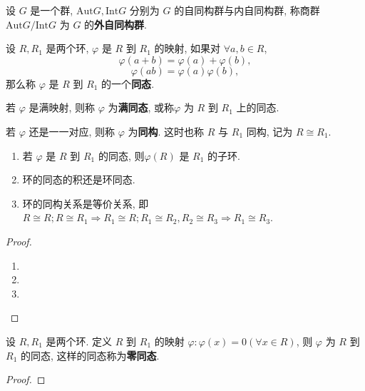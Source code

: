 \documentclass[../../main.tex]{subfiles}
\begin{document}
\begin{definition}
设 \( G \) 是一个群, \( \text{Aut}G, \text{Int}G \) 分别为 \( G \) 的自同构群与内自同构群, 称商群 \( \text{Aut}G/\text{Int}G \) 为 \( G \) 的\textbf{外自同构群}.
\end{definition}

\begin{definition}
设 \( R, R_1 \) 是两个环, \( \varphi \) 是 \( R \) 到 \( R_1 \) 的映射, 如果对 \( \forall a,b \in R \),
\[
\varphi(a + b) = \varphi(a) + \varphi(b),
\]
\[
\varphi(ab) = \varphi(a)\varphi(b),
\]
那么称 \( \varphi \) 是 \( R \) 到 \( R_1 \) 的一个\textbf{同态}.

若 \( \varphi \) 是满映射, 则称 \( \varphi \) 为\textbf{满同态}, 或称\( \varphi \) 为 \( R \) 到 \( R_1 \) 上的同态.

若 \( \varphi \) 还是一一对应, 则称 \( \varphi \) 为\textbf{同构}. 这时也称 \( R \) 与 \( R_1 \) 同构, 记为 \( R \cong R_1 \).
\end{definition}

\begin{proposition}
\begin{enumerate}
\item 若 \( \varphi \) 是 \( R \) 到 \( R_1 \) 的同态, 则\( \varphi(R) \) 是 \( R_1 \) 的子环. 

\item 环的同态的积还是环同态. 

\item 环的同构关系是等价关系, 即 \( R \cong R; R \cong R_1 \Rightarrow R_1 \cong R; R_1 \cong R_2, R_2 \cong R_3 \Rightarrow R_1 \cong R_3 \).
\end{enumerate}
\end{proposition}
\begin{proof}
\begin{enumerate}
\item 

\item 

\item 
\end{enumerate}
\end{proof}

\begin{example}
设 \( R, R_1 \) 是两个环. 定义 \( R \) 到 \( R_1 \) 的映射 \( \varphi: \varphi(x) = 0 (\forall x \in R) \), 则 \( \varphi \) 为 \( R \) 到 \( R_1 \) 的同态, 这样的同态称为\textbf{零同态}.
\end{example}
\begin{proof}

\end{proof}
\end{document}
